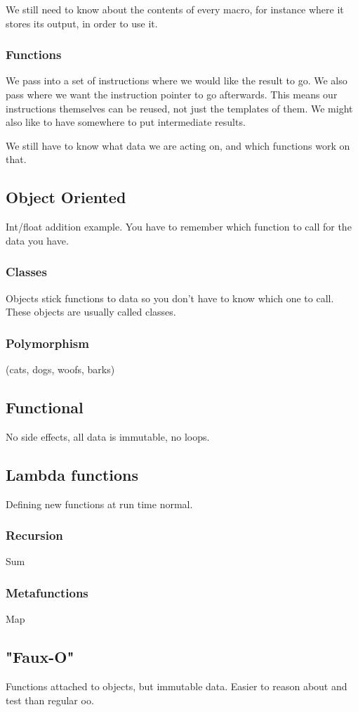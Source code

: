 \documentclass{article}
\begin{document}
We still need to know about the contents of every macro, for instance where it
stores its output, in order to use it.
\subsubsection{Functions}
We pass into a set of instructions where we would like the result to go.
We also pass where we want the instruction pointer to go afterwards.
This means our instructions themselves can be reused, not just the templates of them.
We might also like to have somewhere to put intermediate results.

We still have to know what data we are acting on, and which functions work on that.
\subsection{Object Oriented}
Int/float addition example.
You have to remember which function to call for the data you have.
\subsubsection{Classes}
Objects stick functions to data so you don't have to know which one to call.
These objects are usually called classes.
\subsubsection{Polymorphism}
(cats, dogs, woofs, barks)
\subsection{Functional}
No side effects, all data is immutable, no loops.
\subsection{Lambda functions}
Defining new functions at run time normal.

\subsubsection{Recursion}
Sum

\subsubsection{Metafunctions}
Map
\subsection{"Faux-O"}
Functions attached to objects, but immutable data.
Easier to reason about and test than regular oo.
\end{document}
